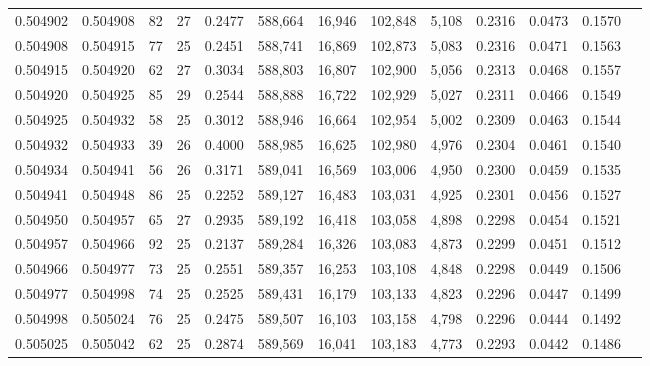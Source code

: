 \begin{tabular}{rrrrrrrrrrrrr}
0.504902 & 0.504908 &  82 &  27 &                                     0.2477 & 588,664 &  16,946 & 102,848 &   5,108 & 0.2316 & 0.0473 & 0.1570 \\
0.504908 & 0.504915 &  77 &  25 &                                     0.2451 & 588,741 &  16,869 & 102,873 &   5,083 & 0.2316 & 0.0471 & 0.1563 \\
0.504915 & 0.504920 &  62 &  27 &                                     0.3034 & 588,803 &  16,807 & 102,900 &   5,056 & 0.2313 & 0.0468 & 0.1557 \\
0.504920 & 0.504925 &  85 &  29 &                                     0.2544 & 588,888 &  16,722 & 102,929 &   5,027 & 0.2311 & 0.0466 & 0.1549 \\
0.504925 & 0.504932 &  58 &  25 &                                     0.3012 & 588,946 &  16,664 & 102,954 &   5,002 & 0.2309 & 0.0463 & 0.1544 \\
0.504932 & 0.504933 &  39 &  26 &                                     0.4000 & 588,985 &  16,625 & 102,980 &   4,976 & 0.2304 & 0.0461 & 0.1540 \\
0.504934 & 0.504941 &  56 &  26 &                                     0.3171 & 589,041 &  16,569 & 103,006 &   4,950 & 0.2300 & 0.0459 & 0.1535 \\
0.504941 & 0.504948 &  86 &  25 &                                     0.2252 & 589,127 &  16,483 & 103,031 &   4,925 & 0.2301 & 0.0456 & 0.1527 \\
0.504950 & 0.504957 &  65 &  27 &                                     0.2935 & 589,192 &  16,418 & 103,058 &   4,898 & 0.2298 & 0.0454 & 0.1521 \\
0.504957 & 0.504966 &  92 &  25 &                                     0.2137 & 589,284 &  16,326 & 103,083 &   4,873 & 0.2299 & 0.0451 & 0.1512 \\
0.504966 & 0.504977 &  73 &  25 &                                     0.2551 & 589,357 &  16,253 & 103,108 &   4,848 & 0.2298 & 0.0449 & 0.1506 \\
0.504977 & 0.504998 &  74 &  25 &                                     0.2525 & 589,431 &  16,179 & 103,133 &   4,823 & 0.2296 & 0.0447 & 0.1499 \\
0.504998 & 0.505024 &  76 &  25 &                                     0.2475 & 589,507 &  16,103 & 103,158 &   4,798 & 0.2296 & 0.0444 & 0.1492 \\
0.505025 & 0.505042 &  62 &  25 &                                     0.2874 & 589,569 &  16,041 & 103,183 &   4,773 & 0.2293 & 0.0442 & 0.1486 \\

\end{tabular}
